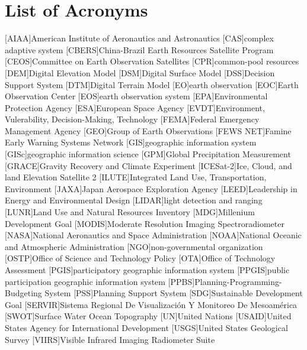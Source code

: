 \tableofcontents
\newpage
\listoffigures
\newpage
\listoftables
\newpage
\chapter*{List of Acronyms}

\begin{acronym}[HyperLEAVES] \itemsep0pt \setlength{\parskip}{0pt}
[AIAA]{American Institute of Aeronautics and Astronautics}
[CAS]{complex adaptive system}
[CBERS]{China-Brazil Earth Resources Satellite Program}
[CEOS]{Committee on Earth Observation Satellites}
[CPR]{common-pool resources}
[DEM]{Digital Elevation Model}
[DSM]{Digital Surface Model}
[DSS]{Decision Support System}
[DTM]{Digital Terrain Model}
[EO]{earth observation}
[EOC]{Earth Observation Center}
[EOS]{earth observation system}
[EPA]{Environmental Protection Agency}
[ESA]{European Space Agency}
[EVDT]{Environment, Vulerability, Decision-Making, Technology}
[FEMA]{Federal Emergency Management Agency}
[GEO]{Group of Earth Observations}
[FEWS NET]{Famine Early Warning Systems Network}
[GIS]{geographic information system}
[GISc]{geographic information science}
[GPM]{Global Precipitation Measurement}
[GRACE]{Gravity Recovery and Climate Experiment}
[ICESat-2]{Ice, Cloud, and land Elevation Satellite 2}
[ILUTE]{Integrated Land Use, Transportation, Environment}
[JAXA]{Japan Aerospace Exploration Agency}
[LEED]{Leadership in Energy and Environmental Design}
[LIDAR]{light detection and ranging}
[LUNR]{Land Use and Natural Resources Inventory}
[MDG]{Millenium Development Goal}
[MODIS]{Moderate Resolution Imaging Spectroradiometer}
[NASA]{National Aeronautics and Space Administration}
[NOAA]{National Oceanic and Atmospheric Administration}
[NGO]{non-governmental organization}
[OSTP]{Office of Science and Technology Policy}
[OTA]{Office of Technology Assessment}
[PGIS]{participatory geographic information system}
[PPGIS]{public participation geographic information system}
[PPBS]{Planning-Programming-Budgeting System}
[PSS]{Planning Support System}
[SDG]{Sustainable Development Goal}
[SERVIR]{Sistema Regional De Visualizaci\'{o}n Y Monitoreo De Mesoam\'{e}rica}
[SWOT]{Surface Water Ocean Topography}
[UN]{United Nations}
[USAID]{United States Agency for International Development}
[USGS]{United States Geological Survey}
[VIIRS]{Visible Infrared Imaging Radiometer Suite}


\end{acronym}
